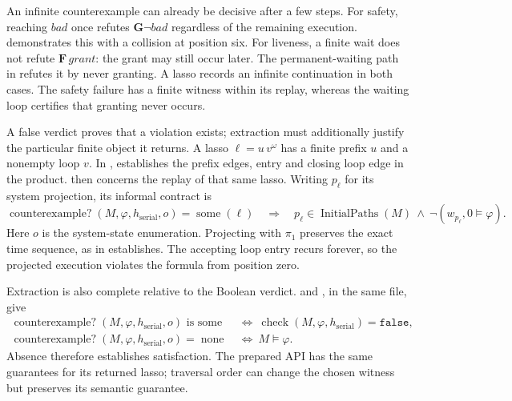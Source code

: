 An infinite counterexample can already be decisive after a few steps.
For safety, reaching $\mathit{bad}$ once refutes
$\mathbf{G}\neg\mathit{bad}$ regardless of the remaining execution.
 demonstrates this with a collision at position
six.  For liveness, a finite wait does not refute
$\mathbf{F}\,\mathit{grant}$: the grant may still occur later.
The permanent-waiting path in  refutes it by
never granting.  A lasso records an infinite continuation in both cases.
The safety failure has a finite witness within its replay, whereas the
waiting loop certifies that granting never occurs.

A false verdict proves that a violation exists; extraction must additionally
justify the particular finite object it returns.  A lasso $\ell=u\,v^\omega$
has a finite prefix $u$ and a nonempty loop $v$.  In
,
 establishes the prefix edges, entry and closing
loop edge in the product.   then concerns the
replay of that same lasso.  Writing $p_\ell$ for its system projection,
its informal contract is
\[
  \operatorname{counterexample?}(M,\varphi,h_{\mathrm{serial}},o)
       =\operatorname{some}(\ell)
  \quad\Longrightarrow\quad
  p_\ell\in\operatorname{InitialPaths}(M)
       \ \land\ \neg(w_{p_\ell},0\models\varphi).
\]
Here $o$ is the system-state enumeration.  Projecting with $\pi_1$ preserves
the exact time sequence, as  in
 establishes.  The accepting loop entry recurs
forever, so the projected execution violates the formula from position zero.

Extraction is also complete relative to the Boolean verdict.
 and
, in the same file, give
\begin{align*}
  \operatorname{counterexample?}(M,\varphi,h_{\mathrm{serial}},o)
       \text{ is some}
    &\ \Longleftrightarrow\
       \operatorname{check}(M,\varphi,h_{\mathrm{serial}})=\mathtt{false},\\
  \operatorname{counterexample?}(M,\varphi,h_{\mathrm{serial}},o)
       =\operatorname{none}
    &\ \Longleftrightarrow\ M\models\varphi.
\end{align*}
Absence therefore establishes satisfaction.  The prepared API has the same
guarantees for its returned lasso; traversal order can change the chosen
witness but preserves its semantic guarantee.

